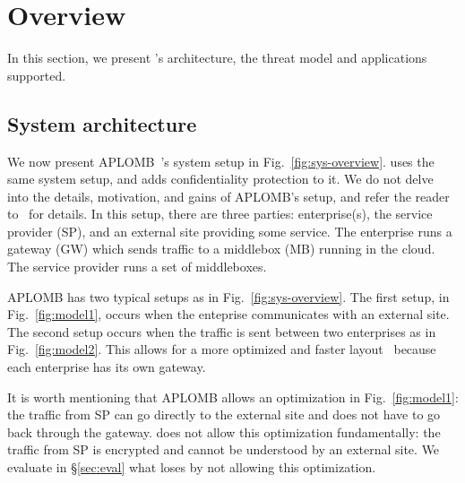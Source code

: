 


     
\section{Overview}\label{sec:overview}








In this section, we present \sys's architecture, the threat model and applications supported.


\subsection{System architecture}

We now present APLOMB~\cite{aplomb}'s system setup in Fig.~\ref{fig:sys-overview}. \sys uses the same system setup, and adds confidentiality protection to it.
We do not delve into the details, motivation, and gains of APLOMB's setup, and refer the reader to~\cite{aplomb} for details. 
In this setup, there are three parties: enterprise(s), the service provider (SP), and an external site providing
some service. The enterprise runs a gateway (GW) which sends traffic to a middlebox (MB) running in the cloud.
The service provider runs a set of middleboxes. 

APLOMB has two typical setups as in Fig.~\ref{fig:sys-overview}.  The first setup, in Fig.~\ref{fig:model1},  occurs when the enteprise communicates with an external site. The second setup occurs when the traffic is sent between two enterprises as in Fig.~\ref{fig:model2}. This allows for a more optimized and faster layout~\cite{aplomb} because  each enterprise has its own gateway.

It is worth mentioning that APLOMB allows an optimization in Fig.~\ref{fig:model1}: the traffic from SP can go directly to the external site and does not have to go back through the gateway. \sys does not allow this optimization fundamentally: the traffic from SP is encrypted and cannot be understood by an external site. We evaluate in \S\ref{sec:eval} what \sys loses by not allowing this optimization. 








